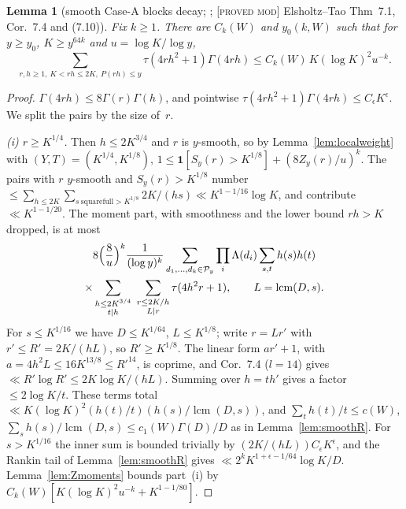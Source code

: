 \documentclass[10pt,reqno]{amsart}
\newtheorem{lemma}[theorem]{Lemma}
\theoremstyle{definition}
\theoremstyle{remark}
\newcommand{\cP}{\mathcal P}
\newcommand{\ind}{\mathbf 1}
\newcommand{\lcm}{\operatorname{lcm}}
\newcommand{\lab}[1]{\textup{[\textsc{#1}]}}
\begin{document}
\begin{lemma}[smooth Case-A blocks decay; {\cite[Lemma~3.1]{KA3}}; \lab{proved mod} Elsholtz--Tao Thm~7.1, Cor.~7.4 and (7.10)]\label{lem:smoothA}
Fix $k\geq1$.  There are $C_k(W)$ and $y_0(k,W)$ such that for $y\geq y_0$,
$K\geq y^{64k}$ and $u=\log K/\log y$,
\[
 \sum_{r,h\geq1,\ K<rh\leq2K,\ P(rh)\leq y}\tau(4rh^2+1)\Gamma(4rh)\leq C_k(W)\,K(\log K)^2u^{-k}.
\]
\end{lemma}
\begin{proof}
$\Gamma(4rh)\leq8\Gamma(r)\Gamma(h)$, and pointwise
$\tau(4rh^2+1)\Gamma(4rh)\leq C_\epsilon K^\epsilon$.  We split the pairs by the size of~$r$.

\emph{(i) $r\geq K^{1/4}$.}  Then $h\leq2K^{3/4}$ and $r$ is $y$-smooth, so by
Lemma~\ref{lem:localweight} with $(Y,T)=(K^{1/4},K^{1/8})$,
$1\leq\ind[S_y(r)>K^{1/8}]+(8Z_y(r)/u)^k$.  The pairs with $r$ $y$-smooth and
$S_y(r)>K^{1/8}$ number $\leq\sum_{h\leq2K}\sum_{s\ \text{squarefull}>K^{1/8}}2K/(hs)\ll K^{1-1/16}\log K$,
and contribute $\ll K^{1-1/20}$.  The moment part, with smoothness and the
lower bound $rh>K$ dropped, is at most
\begin{multline*}
 8\Bigl(\frac8u\Bigr)^k\frac1{(\log y)^k}\sum_{d_1,\dots,d_k\in\cP_y}\prod_i\Lambda(d_i)\sum_{s,t}h(s)h(t)\\
 \times\sum_{\substack{h\leq2K^{3/4}\\ t\mid h}}\ \sum_{\substack{r\leq2K/h\\ L\mid r}}\tau(4h^2r+1),\qquad L=\lcm(D,s).
\end{multline*}
For $s\leq K^{1/16}$ we have $D\leq K^{1/64}$, $L\leq K^{1/8}$; write $r=Lr'$ with
$r'\leq R'=2K/(hL)$, so $R'\geq K^{1/8}$.  The linear form $ar'+1$, with
$a=4h^2L\leq16K^{13/8}\leq R'^{14}$, is coprime, and Cor.~7.4 ($l=14$) gives
$\ll R'\log R'\leq2K\log K/(hL)$.  Summing over $h=th'$ gives a factor
$\leq2\log K/t$.  These terms total
$\ll K(\log K)^2(h(t)/t)(h(s)/\lcm(D,s))$, and $\sum_th(t)/t\leq c(W)$,
$\sum_sh(s)/\lcm(D,s)\leq c_1(W)\Gamma(D)/D$ as in Lemma~\ref{lem:smoothR}.  For
$s>K^{1/16}$ the inner sum is bounded trivially by $(2K/(hL))C_\epsilon K^\epsilon$, and the
Rankin tail of Lemma~\ref{lem:smoothR} gives $\ll2^kK^{1+\epsilon-1/64}\log K/D$.
Lemma~\ref{lem:Zmoments} bounds part~(i) by $C_k(W)[K(\log K)^2u^{-k}+K^{1-1/80}]$.


\end{proof}
\end{document}
